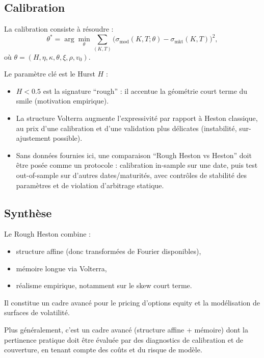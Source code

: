 \documentclass[11pt,a4paper]{article}
\newcommand{\1}{\mathbf{1}}
\begin{document}
\subsection*{Calibration}

La calibration consiste à résoudre :
\[
\theta^*
=
\arg\min_{\theta}
\sum_{(K,T)}
\bigl(
\sigma_{\mathrm{mod}}(K,T;\theta)
-
\sigma_{\mathrm{mkt}}(K,T)
\bigr)^2,
\]
où $\theta = (H,\eta,\kappa,\theta,\xi,\rho,v_0)$.

Le paramètre clé est le Hurst $H$ :

\begin{itemize}
  \item $H<0.5$ est la signature ``rough'' : il accentue la g\'eom\'etrie court terme du smile (motivation empirique).
  \item La structure Volterra augmente l'expressivit\'e par rapport \`a Heston classique, au prix d'une calibration
        et d'une validation plus d\'elicates (instabilit\'e, sur-ajustement possible).
  \item Sans donn\'ees fournies ici, une comparaison ``Rough Heston vs Heston'' doit \^etre pos\'ee comme un protocole :
        calibration in-sample sur une date, puis test out-of-sample sur d'autres dates/maturit\'es, avec contr\^oles
        de stabilit\'e des param\`etres et de violation d'arbitrage statique.
\end{itemize}

\subsection*{Synthèse}

Le Rough Heston combine :
\begin{itemize}
  \item structure affine (donc transformées de Fourier disponibles),
  \item mémoire longue via Volterra,
  \item réalisme empirique, notamment sur le skew court terme.
\end{itemize}

Il constitue un cadre avanc\'e pour le pricing d'options equity et la mod\'elisation de surfaces de volatilit\'e.

Plus g\'en\'eralement, c'est un cadre avanc\'e (structure affine + m\'emoire) dont la pertinence pratique doit \^etre
\'evalu\'ee par des diagnostics de calibration et de couverture, en tenant compte des co\^uts et du risque de mod\`ele.
\end{document}

